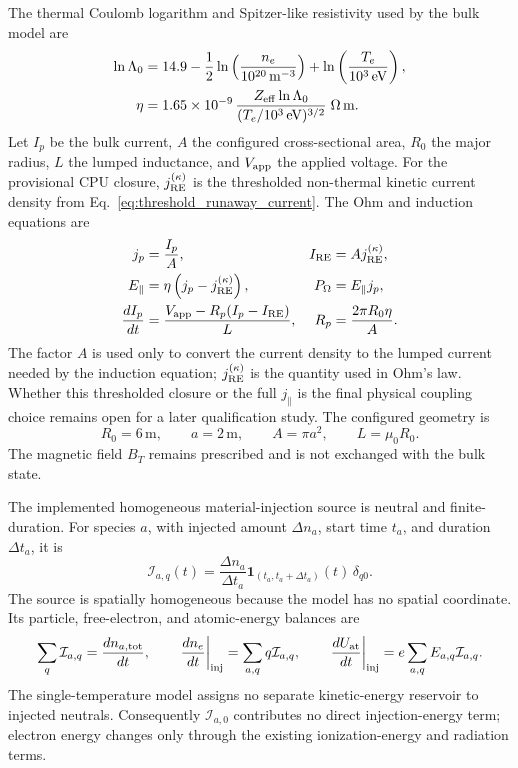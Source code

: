 \documentclass[11pt]{article}
\begin{document}
The thermal Coulomb logarithm and Spitzer-like resistivity used by the bulk model are
\begin{align}
 \ln\Lambda_0&=14.9-\frac12\ln\left(\frac{n_e}{10^{20}\,\mathrm{m}^{-3}}\right)
 +\ln\left(\frac{T_e}{10^3\,\mathrm{eV}}\right),\\
 \eta&=1.65\times10^{-9}\,\frac{Z_{\rm eff}\ln\Lambda_0}
 {(T_e/10^3\,\mathrm{eV})^{3/2}}\;\Omega\,\mathrm{m}.
 \label{eq:bulk_resistivity}
\end{align}
Let $I_p$ be the bulk current, $A$ the configured cross-sectional area, $R_0$ the
major radius, $L$ the lumped inductance, and $V_{\rm app}$ the applied voltage.  For
the provisional CPU closure, $j_{\rm RE}^{(\kappa)}$ is the thresholded non-thermal
kinetic current density from Eq.~\eqref{eq:threshold_runaway_current}.  The Ohm and
induction equations are
\begin{align}
 j_p&=\frac{I_p}{A},
 &I_{\rm RE}&=A j_{\rm RE}^{(\kappa)},\\
 E_\parallel&=\eta\left(j_p-j_{\rm RE}^{(\kappa)}\right),
 &P_\Omega&=E_\parallel j_p,\\
 \frac{dI_p}{dt}&=\frac{V_{\rm app}-R_p(I_p-I_{\rm RE})}{L},
 &R_p&=\frac{2\pi R_0\eta}{A}.
 \label{eq:bulk_ohm_induction}
\end{align}
The factor $A$ is used only to convert the current density to the lumped current
needed by the induction equation; $j_{\rm RE}^{(\kappa)}$ is the quantity used in
Ohm's law.  Whether this thresholded closure or the full $j_\parallel$ is the final
physical coupling choice remains open for a later qualification study.  The configured geometry is
\begin{equation}
 R_0=6\,\mathrm{m},\qquad a=2\,\mathrm{m},\qquad
 A=\pi a^2,\qquad L=\mu_0R_0.
 \label{eq:bulk_geometry}
\end{equation}
The magnetic field $B_T$ remains prescribed and is not exchanged with the bulk state.

The implemented homogeneous material-injection source is neutral and finite-duration.
For species $a$, with injected amount $\Delta n_a$, start time $t_a$, and duration
$\Delta t_a$, it is
\begin{equation}
 \mathcal I_{a,q}(t)=
 \frac{\Delta n_a}{\Delta t_a}
 \mathbf 1_{(t_a,t_a+\Delta t_a)}(t)\,\delta_{q0}.
 \label{eq:bulk_neutral_injection_source}
\end{equation}
The source is spatially homogeneous because the model has no spatial coordinate.  Its
particle, free-electron, and atomic-energy balances are
\begin{equation}
 \sum_q\mathcal I_{a,q}=\frac{dn_{a,\rm tot}}{dt},
 \qquad
 \left.\frac{dn_e}{dt}\right|_{\rm inj}=\sum_{a,q}q\mathcal I_{a,q},
 \qquad
 \left.\frac{dU_{\rm at}}{dt}\right|_{\rm inj}
 =e\sum_{a,q}E_{a,q}\mathcal I_{a,q}.
 \label{eq:bulk_injection_sources}
\end{equation}
The single-temperature model assigns no separate kinetic-energy reservoir to injected
neutrals.  Consequently $\mathcal I_{a,0}$ contributes no direct injection-energy term;
electron energy changes only through the existing ionization-energy and radiation terms.
\end{document}
